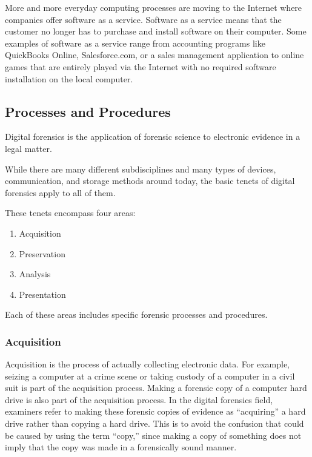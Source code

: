 More and more everyday computing processes are moving to the Internet
where companies offer software as a service. Software as a service means that
the customer no longer has to purchase and install software on their computer.
Some examples of software as a service range from accounting programs like
QuickBooks Online, Salesforce.com, or a sales management application to online
games that are entirely played via the Internet with no required software installation
on the local computer.

\subsection{Processes and Procedures}

Digital forensics is the application of forensic science to electronic evidence in a
legal matter.

While there are many different subdisciplines and many types of devices, communication,
and storage methods around today, the basic tenets of digital forensics
apply to all of them.

These tenets encompass four areas:

\begin{enumerate}
\item Acquisition
\item Preservation
\item Analysis
\item Presentation
\end{enumerate}

Each of these areas includes specific forensic processes and procedures.

\subsubsection{Acquisition}

Acquisition is the process of actually collecting electronic data. For example, seizing
a computer at a crime scene or taking custody of a computer in a civil suit is
part of the acquisition process. Making a forensic copy of a computer hard drive
is also part of the acquisition process. In the digital forensics field, examiners refer
to making these forensic copies of evidence as “acquiring” a hard drive rather than
copying a hard drive. This is to avoid the confusion that could be caused by using
the term “copy,” since making a copy of something does not imply that the copy
was made in a forensically sound manner.

